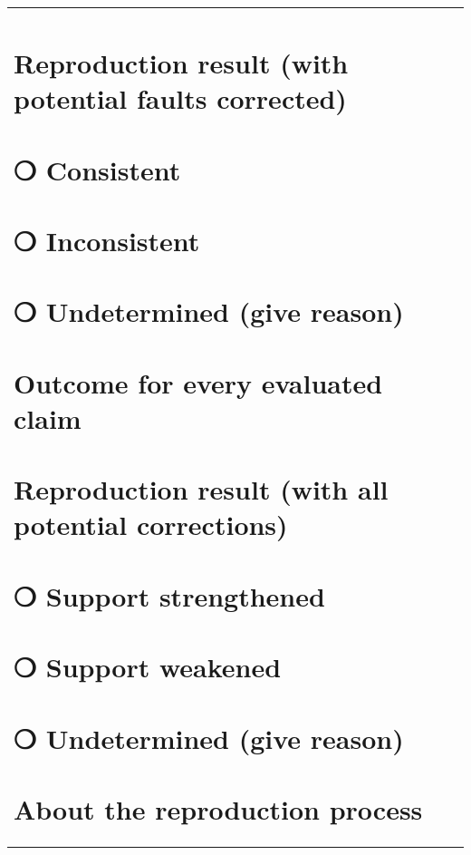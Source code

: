 \documentclass[authordate, empirical]{jote-new-article}
\begin{document}
\begin{table}
\begin{tabularx}{\linewidth}{@{} l @{}}
			\section{Reproduction result (with potential faults corrected)}



			\section{❍ Consistent}



			\section{❍ Inconsistent}



			\section{❍ Undetermined (give reason)}



			\section{Outcome for every evaluated claim}



			\section{Reproduction result (with all potential corrections)}



			\section{❍ Support strengthened}



			\section{❍ Support weakened}



			\section{❍ Undetermined (give reason)}



			\section{About the reproduction process}




\end{tabularx}
\end{table}
\end{document}
